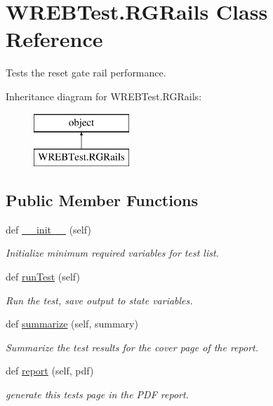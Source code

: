 \hypertarget{class_w_r_e_b_test_1_1_r_g_rails}{}\section{W\+R\+E\+B\+Test.\+R\+G\+Rails Class Reference}
\label{class_w_r_e_b_test_1_1_r_g_rails}


Tests the reset gate rail performance.  


Inheritance diagram for W\+R\+E\+B\+Test.\+R\+G\+Rails\+:\begin{figure}[H]
\begin{center}
\leavevmode
\includegraphics[height=2.000000cm]{class_w_r_e_b_test_1_1_r_g_rails}
\end{center}
\end{figure}
\subsection*{Public Member Functions}
\begin{DoxyCompactItemize}
\item 
def \hyperlink{class_w_r_e_b_test_1_1_r_g_rails_aa88fe8bf073459ccdd221172f50bf78c}{\+\_\+\+\_\+init\+\_\+\+\_\+} (self)
\begin{DoxyCompactList}\small\item\em Initialize minimum required variables for test list. \end{DoxyCompactList}\item 
def \hyperlink{class_w_r_e_b_test_1_1_r_g_rails_ad734ff3e10aac9d80365f55dc88f5adc}{run\+Test} (self)
\begin{DoxyCompactList}\small\item\em Run the test, save output to state variables. \end{DoxyCompactList}\item 
def \hyperlink{class_w_r_e_b_test_1_1_r_g_rails_a7c0b9c673b50fdaa24e1911a0634adca}{summarize} (self, summary)
\begin{DoxyCompactList}\small\item\em Summarize the test results for the cover page of the report. \end{DoxyCompactList}\item 
def \hyperlink{class_w_r_e_b_test_1_1_r_g_rails_ab0a6494b3e2b87d70cd08aa8556743bd}{report} (self, pdf)
\begin{DoxyCompactList}\small\item\em generate this test\textquotesingle{}s page in the P\+DF report. \end{DoxyCompactList}\end{DoxyCompactItemize}


